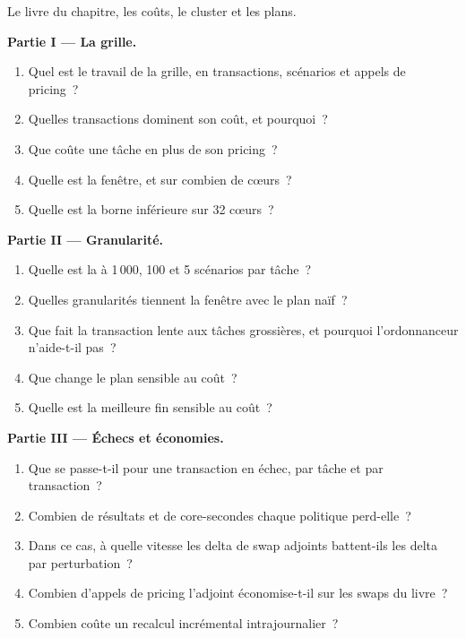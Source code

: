 \begin{problem}\label{pb:pl:the-risk-grid:1}
Le livre du chapitre, les coûts, le cluster et les plans.

\medskip\noindent\textbf{Partie I --- La grille.}
\begin{enumerate}
\item Quel est le travail de la grille, en transactions, scénarios et appels de pricing~?
\item Quelles transactions dominent son coût, et pourquoi~?
\item Que coûte une tâche en plus de son pricing~?
\item Quelle est la fenêtre, et sur combien de cœurs~?
\item Quelle est la borne inférieure sur 32 cœurs~?
\end{enumerate}

\medskip\noindent\textbf{Partie II --- Granularité.}
\begin{enumerate}[resume]
\item Quelle est la  à 1\,000, 100 et 5 scénarios par tâche~?
\item Quelles granularités tiennent la fenêtre avec le plan naïf~?
\item Que fait la transaction lente aux tâches grossières, et pourquoi l'ordonnanceur n'aide-t-il pas~?
\item Que change le plan sensible au coût~?
\item Quelle est la meilleure fin sensible au coût~?
\end{enumerate}

\medskip\noindent\textbf{Partie III --- Échecs et économies.}
\begin{enumerate}[resume]
\item Que se passe-t-il pour une transaction en échec, par tâche et par transaction~?
\item Combien de résultats et de core-secondes chaque politique perd-elle~?
\item Dans ce cas, à quelle vitesse les delta de swap adjoints battent-ils les delta par perturbation~?
\item Combien d'appels de pricing l'adjoint économise-t-il sur les swaps du livre~?
\item Combien coûte un recalcul incrémental intrajournalier~?
\end{enumerate}


\end{problem}
